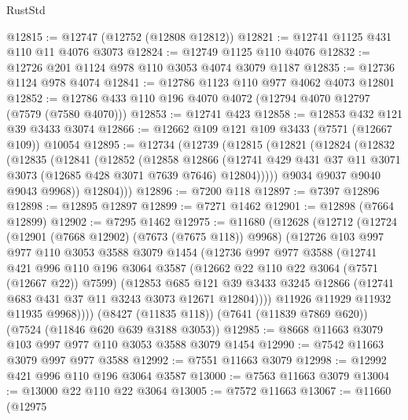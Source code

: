 \begin{lexlean}{RustStd}
\begin{coremodule}
{\begin{coremodule}
{{{{{{{{{{{{{{{{{{{{{{{{{{{{{{{{@12815 := @12747 (@12752 (@12808 @12812))
@12821 := @12741 @1125 @431 @110 @11 @4076 @3073
@12824 := @12749 @1125 @110 @4076
@12832 := @12726 @201 @1124 @978 @110 @3053 @4074 @3079 @1187
@12835 := @12736 @1124 @978 @4074
@12841 := @12786 @1123 @110 @977 @4062 @4073 @12801
@12852 := @12786 @433 @110 @196 @4070 @4072 (@12794 @4070 @12797 (@7579 (@7580 @4070)))
@12853 := @12741 @423
@12858 := @12853 @432 @121 @39 @3433 @3074
@12866 := @12662 @109 @121 @109 @3433 (@7571 (@12667 @109)) @10054
@12895 := @12734
    (@12739
      (@12815
        (@12821
          (@12824
            (@12832
              (@12835
                (@12841
                  (@12852
                    (@12858
                      @12866
                      (@12741
                        @429
                        @431
                        @37
                        @11
                        @3071
                        @3073
                        (@12685 @428 @3071 @7639 @7646)
                        @12804)))))
              @9034
              @9037
              @9040
              @9043
              @9968))
          @12804)))
@12896 := @7200 @118
@12897 := @7397 @12896
@12898 := @12895 @12897
@12899 := @7271 @1462
@12901 := @12898 (@7664 @12899)
@12902 := @7295 @1462
@12975 := @11680
    (@12628
      (@12712
        (@12724
          (@12901 (@7668 @12902) (@7673 (@7675 @118)) @9968)
          (@12726
            @103
            @997
            @977
            @110
            @3053
            @3588
            @3079
            @1454
            (@12736
              @997
              @977
              @3588
              (@12741
                @421
                @996
                @110
                @196
                @3064
                @3587
                (@12662 @22 @110 @22 @3064 (@7571 (@12667 @22)) @7599)
                (@12853
                  @685
                  @121
                  @39
                  @3433
                  @3245
                  @12866
                  (@12741 @683 @431 @37 @11 @3243 @3073 @12671 @12804))))
            @11926
            @11929
            @11932
            @11935
            @9968))))
    (@8427 (@11835 @118))
    (@7641 (@11839 @7869 @620))
    (@7524 (@11846 @620 @639 @3188 @3053))
@12985 := @8668 @11663 @3079 @103 @997 @977 @110 @3053 @3588 @3079 @1454
@12990 := @7542 @11663 @3079 @997 @977 @3588
@12992 := @7551 @11663 @3079
@12998 := @12992 @421 @996 @110 @196 @3064 @3587
@13000 := @7563 @11663 @3079
@13004 := @13000 @22 @110 @22 @3064
@13005 := @7572 @11663
@13067 := @11660
    (@12975
}}}}}}}}}}}}}}}}}}}}}}}}}}}}}}}}
\end{coremodule}}
\end{coremodule}
\end{lexlean}
